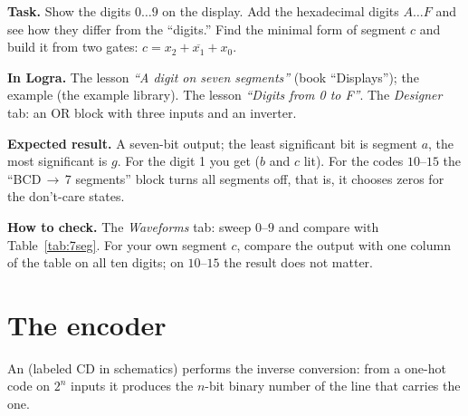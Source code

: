 \begin{diybox}
\textbf{Task.}  Show the digits $0\ldots9$ on the display.
 Add the hexadecimal digits $A\ldots F$ and see
how they differ from the ``digits.''  Find the minimal form of
segment $c$ and build it from two gates: $c=x_2+\overline{x_1}+x_0$.

\textbf{In Logra.}  The lesson \emph{``A digit on seven segments''} (book
``Displays''); the example  (the example library).
 The lesson \emph{``Digits from 0 to F''}.  The \emph{Designer}
tab: an OR block with three inputs and an inverter.

\textbf{Expected result.} A seven-bit output; the least significant bit is segment
$a$, the most significant is $g$. For the digit 1 you get  ($b$ and $c$ lit).
For the codes $10$--$15$ the ``BCD\,$\to$\,7 segments'' block turns all
segments off, that is, it chooses zeros for the don't-care states.

\textbf{How to check.} The \emph{Waveforms} tab: sweep $0$--$9$
and compare with Table~\ref{tab:7seg}. For your own segment
$c$, compare the output with one column of the table on all ten digits; on
$10$--$15$ the result does not matter.
\end{diybox}

\section{The encoder}

An  (labeled CD in schematics) performs the inverse
conversion: from a one-hot code on $2^n$ inputs it produces the $n$-bit
binary number of the line that carries the one.

